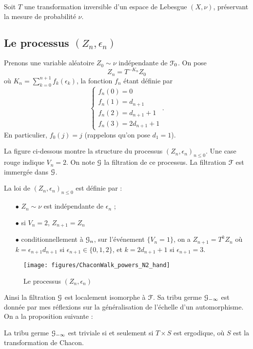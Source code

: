 \documentclass[12pt,a4paper]{article}
\begin{document}
Soit $T$ une transformation inversible d'un espace de Lebesgue $(X,\nu)$, 
préservant la mesure de probabilité $\nu$. 

\subsection{Le processus $(Z_n,\epsilon_n)$}

Prenons une variable aléatoire $Z_0 \sim \nu$ indépendante de $\EuScript{F}_0$. 
On pose 
$$
Z_n = T^{-K_n}Z_0
$$
où $K_n=\sum_{k=0}^{n+1}f_k(\epsilon_k)$, la fonction $f_n$ étant définie par 
$$
\begin{cases}
f_n(0) = 0 \\ 
f_n(1) = d_{n+1} \\ 
f_n(2) = d_{n+1}+1 \\
f_n(3) = 2 d_{n+1} + 1
\end{cases}.
$$
En particulier, $f_0(j)=j$ (rappelons qu'on pose $d_1=1$). 

La figure ci-dessous montre la structure du processus ${(Z_n, \epsilon_n)}_{n \leq 0}$. 
Une case rouge indique $V_n=2$. 
On note $\EuScript{G}$ la filtration de ce processus. La filtration $\EuScript{F}$ est immergée dans $\EuScript{G}$. 

La loi de ${(Z_n, \epsilon_n)}_{n \leq 0}$ est définie par : 
\begin{itemize}
\item[$\bullet$] $Z_n \sim \nu$ est indépendante de $\epsilon_n$ ;

\item[$\bullet$] si $V_n=2$, $Z_{n+1} = Z_n$ 

\item[$\bullet$] conditionnellement à $\EuScript{G}_n$, sur l'événement $\{V_n=1\}$, 
on a $Z_{n+1} = T^k Z_n$ où $k=\epsilon_{n+1} d_{n+1}$ si $\epsilon_{n+1} \in \{0, 1, 2\}$, 
et $k = 2 d_{n+1} + 1$ si $\epsilon_{n+1}=3$. 
\end{itemize}

\begin{figure}[!h]
\centering
	\texttt{[image: figures/ChaconWalk\_powers\_N2\_hand]}
\caption{Le processus $(Z_n, \epsilon_n)$}\label{fig:Zn}
\end{figure}

Ainsi la filtration $\EuScript{G}$ est localement isomorphe à $\EuScript{F}$. 
Sa tribu germe $\EuScript{G}_{-\infty}$ est donnée par mes réflexions 
sur la généralisation de l'échelle d'un automorphisme. 
On a la proposition suivante : 

\begin{ppsition}
La tribu germe $\EuScript{G}_{-\infty}$ est triviale si et seulement si $T\times S$ est ergodique, 
où $S$ est la transformation de Chacon. 
\end{ppsition}
\end{document}
